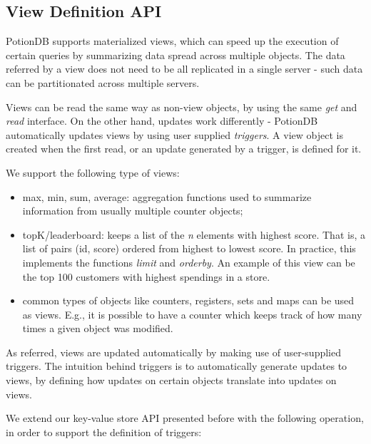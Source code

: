 \documentclass{vldb}
\newcommand{\grumbler}[2]{{\color{red}{\bf #1:} #2}}
\renewcommand{\grumbler}[2]{}
\newcommand{\andre}[1]{\grumbler{andre}{#1}}
\begin{document}
%
%


\subsection{View Definition API}
\label{subsec:viewAPI}

PotionDB supports materialized views, which can speed up the execution of certain queries by summarizing data spread across multiple objects.
The data referred by a view does not need to be all replicated in a single server - such data can be partitionated across multiple servers.

Views can be read the same way as non-view objects, by using the same \emph{get} and \emph{read} interface.
On the other hand, updates work differently - PotionDB automatically updates views by using user supplied \emph{triggers}.
A view object is created when the first read, or an update generated by a trigger, is defined for it.

We support the following type of views:
\begin{itemize}
	\item max, min, sum, average: aggregation functions used to summarize information from usually multiple counter objects;
	\item topK/leaderboard: keeps a list of the \emph{n} elements with highest score. That is, a list of pairs (id, score) ordered from highest to lowest score. In practice, this implements the functions \emph{limit} and \emph{orderby}. An example of this view can be the top 100 customers with highest spendings in a store.
	\item common types of objects like counters, registers, sets and maps can be used as views. E.g., it is possible to have a counter which keeps track of how many times a given object was modified.
\end{itemize}

As referred, views are updated automatically by making use of user-supplied triggers.
The intuition behind triggers is to automatically generate updates to views, by defining how updates on certain objects translate into updates on views.
\andre{How do I refer that this is a common practice too in relational databases?}
We extend our key-value store API presented before with the following operation, in order to support the definition of triggers:
\end{document}
